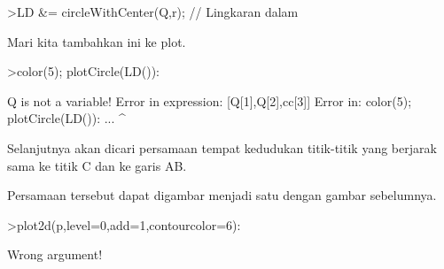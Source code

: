 \documentclass[a4paper,10pt]{article}
\begin{document}
\begin{eulernotebook}
\begin{eulercomment}
\begin{eulercomment}
\begin{eulercomment}
\begin{eulercomment}
\begin{eulercomment}
\begin{eulercomment}
\begin{eulercomment}
\begin{eulercomment}
\begin{eulercomment}
\begin{eulercomment}
\begin{eulercomment}
\begin{eulercomment}
\begin{eulercomment}
\begin{eulercomment}
\begin{eulercomment}
\begin{eulercomment}
\begin{eulerprompt}
>LD &=  circleWithCenter(Q,r); // Lingkaran dalam
\end{eulerprompt}
\begin{eulercomment}
Mari kita tambahkan ini ke plot.
\end{eulercomment}
\begin{eulerprompt}
>color(5); plotCircle(LD()):
\end{eulerprompt}
\begin{euleroutput}
  Q is not a variable!
  Error in expression: [Q[1],Q[2],cc[3]]
  Error in:
  color(5); plotCircle(LD()): ...
                           ^
\end{euleroutput}
\begin{eulercomment}
Selanjutnya akan dicari persamaan tempat kedudukan titik-titik yang berjarak sama ke titik C
dan ke garis AB.
\end{eulercomment}
\begin{eulercomment}
Persamaan tersebut dapat digambar menjadi satu dengan gambar sebelumnya.
\end{eulercomment}
\begin{eulerprompt}
>plot2d(p,level=0,add=1,contourcolor=6):
\end{eulerprompt}
\begin{euleroutput}
  Wrong argument!
  

\end{euleroutput}
\end{eulercomment}
\end{eulercomment}
\end{eulercomment}
\end{eulercomment}
\end{eulercomment}
\end{eulercomment}
\end{eulercomment}
\end{eulercomment}
\end{eulercomment}
\end{eulercomment}
\end{eulercomment}
\end{eulercomment}
\end{eulercomment}
\end{eulercomment}
\end{eulercomment}
\end{eulercomment}
\end{eulernotebook}
\end{document}
